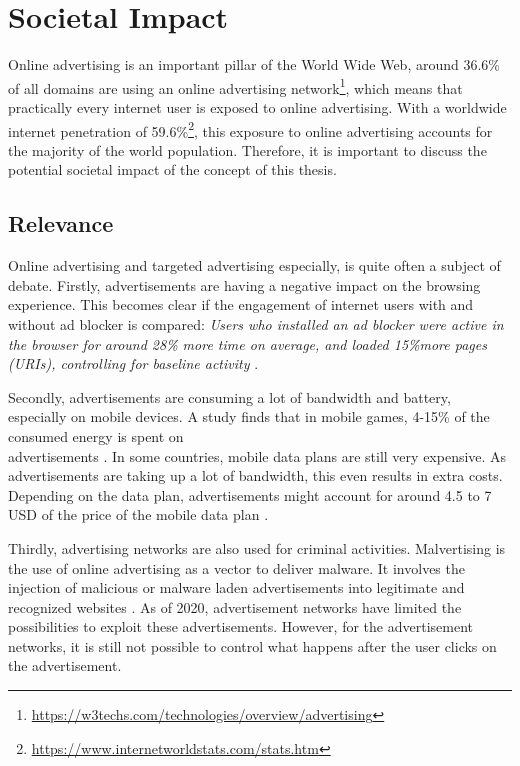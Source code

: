 \chapter{Societal Impact}
\label{cha:societalimpact}

Online advertising is an important pillar of the World Wide Web, around 36.6\% of all domains are using an online advertising network\footnote{\url{https://w3techs.com/technologies/overview/advertising}}, which means that practically every internet user is exposed to online advertising. With a worldwide internet penetration of 59.6\%\footnote{\url{https://www.internetworldstats.com/stats.htm}}, this exposure to online advertising accounts for the majority of the world population. Therefore, it is important to discuss the potential societal impact of the concept of this thesis.

\section{Relevance}
Online advertising and targeted advertising especially, is quite often a subject of debate. Firstly, advertisements are having a negative impact on the browsing experience. This becomes clear if the engagement of internet users with and without ad blocker is compared: \textit{Users who installed an ad blocker were active in the browser for around 28\% more time on average, and loaded 15\%more pages (URIs), controlling for baseline activity} \cite{googlefee}.

Secondly, advertisements are consuming a lot of bandwidth and battery, especially on mobile devices. A study finds that in mobile games, 4-15\% of the consumed energy is spent on\\ advertisements \cite{prochkova2012energy}. In some countries, mobile data plans are still very expensive. As advertisements are taking up a lot of bandwidth, this even results in extra costs. Depending on the data plan, advertisements might account for around 4.5 to 7 USD of the price of the mobile data plan \cite{van2012costs}.

Thirdly, advertising networks are also used for criminal activities. Malvertising is the use of online advertising as a vector to deliver malware. It involves the injection of malicious or malware laden advertisements into legitimate and recognized websites \cite{dwyer2016gone}. As of 2020, advertisement networks have limited the possibilities to exploit these advertisements. However, for the advertisement networks, it is still not possible to control what happens after the user clicks on the advertisement.

